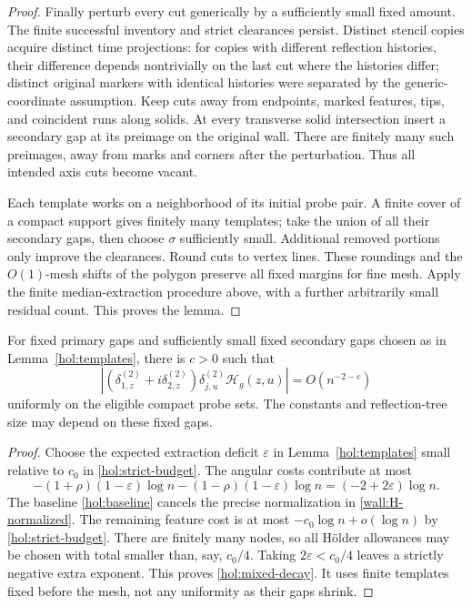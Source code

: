 \begin{proof}
Finally perturb every cut generically by a sufficiently small fixed
amount.  The finite successful inventory and strict clearances persist.
Distinct stencil copies acquire distinct time projections: for copies
with different reflection histories, their difference depends
nontrivially on the last cut where the histories differ; distinct
original markers with identical histories were separated by the
generic-coordinate assumption.  Keep cuts away from endpoints,
marked features, tips, and coincident runs along solids.  At every
transverse solid intersection insert a secondary gap at its preimage
on the original wall.  There are finitely many such preimages, away
from marks and corners after the perturbation.  Thus all intended
axis cuts become vacant.

Each template works on a neighborhood of its initial probe pair.
A finite cover of a compact support gives finitely many templates;
take the union of all their secondary gaps, then choose $\sigma$
sufficiently small.  Additional removed portions only improve the
clearances.  Round cuts to vertex lines.  These roundings and the
$O(1)$-mesh shifts of the polygon preserve all fixed margins for fine
mesh.  Apply the finite median-extraction procedure above, with a
further arbitrarily small residual count.  This proves the lemma.
\end{proof}

\begin{proposition}
\label{hol:mixed-bound}
For fixed primary gaps and sufficiently small fixed secondary gaps
chosen as in Lemma~\ref{hol:templates}, there is $c>0$ such that
\begin{equation}
 \left| (\delta_{1,z}^{(2)}+i\delta_{2,z}^{(2)})
               \delta_{j,u}^{(2)}\mathcal H_g(z,u)\right|
       =O(n^{-2-c})
 \label{hol:mixed-decay}
\end{equation}
uniformly on the eligible compact probe sets.  The constants and
reflection-tree size may depend on these fixed gaps.
\end{proposition}

\begin{proof}
Choose the expected extraction deficit $\varepsilon$ in
Lemma~\ref{hol:templates} small relative to $c_0$ in
\eqref{hol:strict-budget}.  The angular costs contribute at most
\begin{equation}
 -(1+\rho)(1-\varepsilon)\log n
 -(1-\rho)(1-\varepsilon)\log n
       =(-2+2\varepsilon)\log n.
 \label{hol:extracted-cost}
\end{equation}
The baseline \eqref{hol:baseline} cancels the precise normalization
in \eqref{wall:H-normalized}.  The remaining feature cost is at most
$-c_0\log n+o(\log n)$ by \eqref{hol:strict-budget}.
There are finitely many nodes, so all H\"older allowances may be chosen
with total smaller than, say, $c_0/4$.  Taking
$2\varepsilon<c_0/4$ leaves a strictly negative extra exponent.
This proves \eqref{hol:mixed-decay}.  It uses finite templates fixed
before the mesh, not any uniformity as their gaps shrink.
\end{proof}

